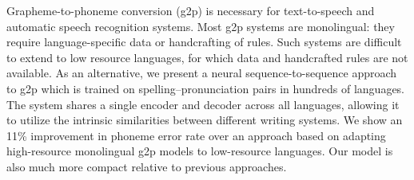 Grapheme-to-phoneme conversion (g2p) is necessary for text-to-speech and automatic speech recognition systems. Most g2p systems are monolingual: they require language-specific data or handcrafting of rules. Such systems are difficult to extend to low resource languages, for which data and handcrafted rules are not available. As an alternative, we present a neural sequence-to-sequence approach to g2p which is trained on spelling--pronunciation pairs in hundreds of languages. The system shares a single encoder and decoder across all languages, allowing it to utilize the intrinsic similarities between different writing systems. We show an 11\% improvement in phoneme error rate over an approach based on adapting high-resource monolingual g2p models to low-resource languages. Our model is also much more compact relative to previous approaches.
